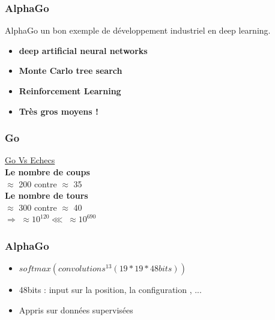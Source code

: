 \begin{frame}
  \frametitle{AlphaGo}
  AlphaGo un bon exemple de développement industriel en deep learning.
  \begin{itemize}
  \item \textbf{deep artificial neural networks}
  \item \textbf{Monte Carlo tree search}
  \item \textbf{Reinforcement Learning}
  \item \textbf{Très gros moyens !}    
  \end{itemize}
\end{frame}

\begin{frame}
  \frametitle{Go}
  \begin{minipage}[c]{0.6\linewidth}
  \end{minipage}\hfill
  \begin{minipage}[c]{0.33\linewidth}
    \begin{center}
      \underline{Go Vs Echecs} \\
      \textbf{Le nombre de coups} \\
      $\approx$ 200 contre $\approx$ 35 \\
      \textbf{Le nombre de tours} \\
      $\approx$ 300 contre $\approx$ 40 \\
      $\Rightarrow$ $\approx 10^{120}\lll \;\approx 10^{690}$
    \end{center}
  \end{minipage}\hfill
\end{frame}

\begin{frame}
  \frametitle{AlphaGo}
  \begin{minipage}[c]{0.50\linewidth}
    \begin{itemize}
    \item $softmax(convolutions^{13}(19*19*48{bits}))$
    \item 48bits : input sur la position, la configuration , ...
    \item Appris sur données supervisées
    \end{itemize}
  \end{minipage}\hfill
  \begin{minipage}[c]{0.49\linewidth}
  \end{minipage}\hfill
\end{frame}

